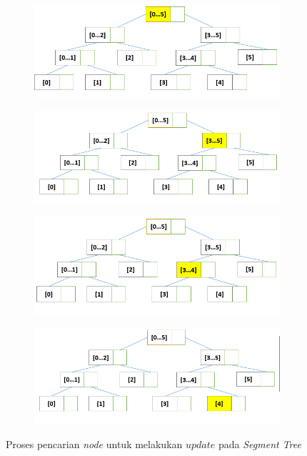 \begin{figure}[H]
	\begin{subfigure}{.5\textwidth}
		\centering
		\includegraphics[scale=0.3]{assets/images/Update_ST_1.PNG}
		\caption{}
		\label{fig:subupdateST1}
	\end{subfigure}
	\begin{subfigure}{.5\textwidth}
		\centering
		\includegraphics[scale=0.3]{assets/images/Update_ST_2.PNG}
		\caption{}
		\label{fig:subupdateST2}
	\end{subfigure}
	\begin{subfigure}{.5\textwidth}
		\centering
		\includegraphics[scale=0.3]{assets/images/Update_ST_3.PNG}
		\caption{}
		\label{fig:subupdateST3}
	\end{subfigure}
	\begin{subfigure}{.5\textwidth}
		\centering
		\includegraphics[scale=0.3]{assets/images/Update_ST_4.PNG}
		\caption{}
		\label{fig:subupdateST4}
	\end{subfigure}
	\caption{Proses pencarian \textit{node} untuk melakukan \textit{$update$} pada \textit{Segment Tree}}
	\label{fig:updateST1}
\end{figure}
